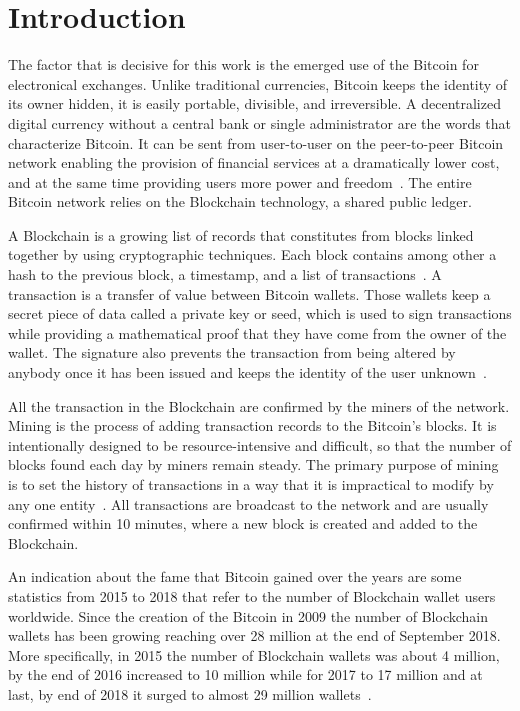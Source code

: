 \section{Introduction}
\label{sec:intro}

The factor that is decisive for this work is the emerged use of the Bitcoin for electronical exchanges. Unlike traditional currencies, Bitcoin keeps the identity of its owner hidden, it is easily portable, divisible, and irreversible. A decentralized digital currency without a central bank or single administrator are the words that characterize Bitcoin. It can be sent from user-to-user on the peer-to-peer Bitcoin network enabling the provision of financial services at a dramatically lower cost, and at the same time providing users more power and freedom~\cite{begginers}. The entire Bitcoin network relies on the Blockchain technology, a shared public ledger.

A Blockchain is a growing list of records that constitutes from blocks linked
together by using cryptographic techniques. Each block contains among other a
hash to the previous block, a timestamp, and a list of
transactions~\cite{wikiBlockchain}. A transaction is a transfer of value
between Bitcoin wallets. Those wallets keep a secret piece of data called a
private key or seed, which is used to sign transactions while providing a
mathematical proof that they have come from the owner of the wallet. The
signature also prevents the transaction from being altered by anybody once it
has been issued and keeps the identity of the user unknown~\cite{howworks}. 

All the transaction in the Blockchain are confirmed by the miners of the
network. Mining is the process of adding transaction records to the Bitcoin's
blocks. It is intentionally designed to be resource-intensive and difficult, so
that the number of blocks found each day by miners remain steady. The primary
purpose of mining is to set the history of transactions in a way that it is
impractical to modify by any one entity~\cite{wikiMining}. All transactions are
broadcast to the network and are usually confirmed within 10 minutes, where a
new block is created and added to the Blockchain.

An indication about the fame that Bitcoin gained over the years are some statistics from 2015 to 2018 that refer to the number of Blockchain wallet users worldwide. Since the creation of the Bitcoin in 2009 the number of Blockchain wallets has been growing reaching over 28 million at the end of September 2018. More specifically, in 2015 the number of Blockchain wallets was about 4 million, by the end of 2016 increased to 10 million while for 2017 to 17 million and at last, by end of 2018 it surged to almost 29 million wallets~\cite{statistics}.

